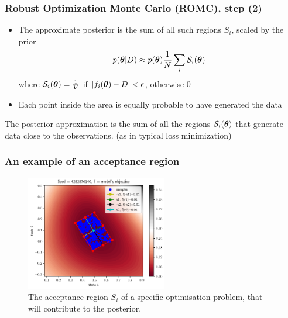 \begin{frame}
  \frametitle{Robust Optimization Monte Carlo (ROMC), step (2)}
  \begin{itemize}
  \item The approximate posterior is the sum of all such regions $S_i$, scaled by the prior
    \begin{equation}
      p(\boldsymbol{\theta}|D) \approx p(\boldsymbol{\theta}) \frac{1}{N} \sum_i \mathcal{S}_i(\boldsymbol{\theta})
    \end{equation}
    where $\mathcal{S}_i(\boldsymbol{\theta}) = \frac{1}{V}$ if $|f_i(\boldsymbol{\theta}) - D| < \epsilon$, otherwise $0$
  \item Each point inside the area is equally probable to have generated the data
  \end{itemize}

  \noindent\makebox[\linewidth]{\rule{\paperwidth}{0.4pt}}
  The posterior approximation is the sum of all the regions $\mathcal{S}_i(\boldsymbol{\theta})$ that generate data close to the observations. (as in typical loss minimization)
\end{frame}


\begin{frame}
  \frametitle{An example of an acceptance region}
  \begin{figure}[ht]
    \begin{center}
        \includegraphics[width=0.55\textwidth]{./images/chapter4/ma2_region_1.png}
    \end{center}
  \caption[The acceptance region of a specific deterministic simulator.]{The acceptance region $S_i$ of a specific optimisation problem, that will contribute to the posterior.}
  \label{fig:ma2_5}
\end{figure}
\end{frame}

